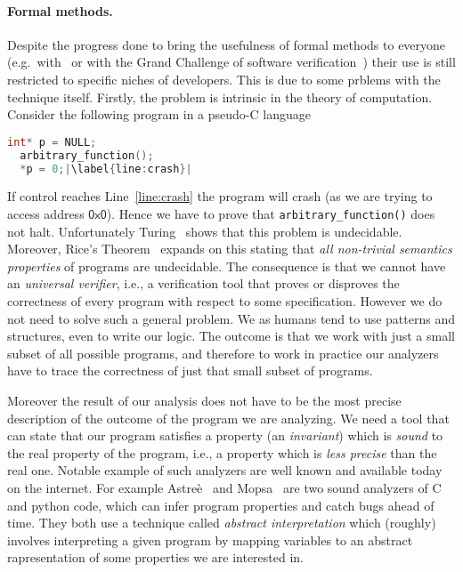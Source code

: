 \paragraph*{Formal methods.} Despite the progress done to bring the
usefulness of formal methods to everyone (e.g.\
with~\cite{10.1145/3371078, 10.1145/3338112} or with the Grand
Challenge of software verification~\cite{1621009,Hoare2008,1707636})
their use is still restricted to specific niches of developers. This
is due to some prblems with the technique itself. Firstly, the problem
is intrinsic in the theory of computation. Consider the following
program in a pseudo-C language

\begin{lstlisting}[language=C,escapechar=|,]
  int* p = NULL;
  arbitrary_function();
  *p = 0;|\label{line:crash}|
\end{lstlisting}

If control reaches Line~\ref{line:crash} the program will crash (as we
are trying to access address \(\mathsf{0x0}\)). Hence we have to
prove that \texttt{arbitrary\_function()} does not halt. Unfortunately
Turing~\cite{10.7551/mitpress/12274.003.0008} shows that this problem
is undecidable. Moreover, Rice's Theorem~\cite{rice1953classes}
expands on this stating that \emph{all non-trivial semantics
  properties} of programs are undecidable. The consequence is that we
cannot have an \emph{universal verifier}, i.e., a verification tool
that proves or disproves the correctness of every program with respect
to some specification. However we do not need to solve such a general
problem. We as humans tend to use patterns and structures, even to
write our logic. The outcome is that we work with just a small subset
of all possible programs, and therefore to work in practice our
analyzers have to trace the correctness of just that small subset of
programs.

\medskip

Moreover the result of our analysis does not have to be the most
precise description of the outcome of the program we are analyzing. We
need a tool that can state that our program satisfies a property (an
\emph{invariant}) which is \emph{sound} to the real property of the
program, i.e., a property which is \emph{less precise} than the real
one. Notable example of such analyzers are well known and available
today on the internet. For example
Astreè~\cite{10.1007/978-3-540-31987-0_3} and
Mopsa~\cite{10.1007/978-3-031-30820-8_37} are two sound analyzers of C
and python code, which can infer program properties and catch bugs
ahead of time. They both use a technique called \emph{abstract
  interpretation} which (roughly) involves interpreting a given
program by mapping variables to an abstract rapresentation of some
properties we are interested in.

